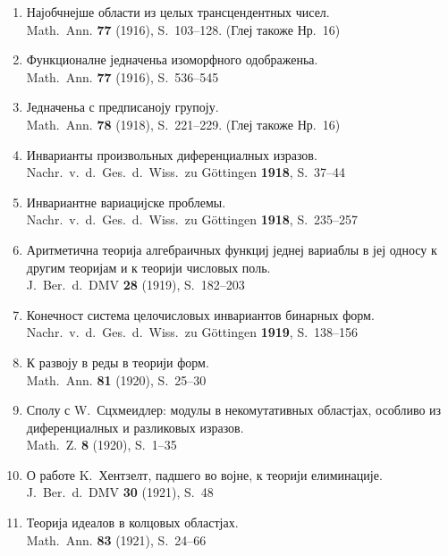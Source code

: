 \documentclass[11pt]{article}
\newcommand{\foreign}[1]{#1}
\begin{document}
\begin{enumerate}[label={\small\arabic*.},leftmargin=2em,itemsep=0.3em]
\item Најобчнејше области из целых трансцендентных чисел.\\
\foreign{Math.\ Ann.} \textbf{77} (1916), S.~103--128. (Глеј такоже Нр.~16)

\item Функционалне једначеньа изоморфного одображеньа.\\
\foreign{Math.\ Ann.} \textbf{77} (1916), S.~536--545

\item Једначеньа с предписаноју групоју.\\
\foreign{Math.\ Ann.} \textbf{78} (1918), S.~221--229. (Глеј такоже Нр.~16)

\item Инварианты произвольных диференциалных изразов.\\
\foreign{Nachr.\ v.\ d.\ Ges.\ d.\ Wiss.\ zu Göttingen} \textbf{1918}, S.~37--44

\item Инвариантне вариацијске проблемы.\\
\foreign{Nachr.\ v.\ d.\ Ges.\ d.\ Wiss.\ zu Göttingen} \textbf{1918}, S.~235--257

\item Аритметична теорија алгебраичных функциј једнеј вариаблы в јеј односу к другим теоријам и к теорији числовых поль.\\
\foreign{J.\ Ber.\ d.\ DMV} \textbf{28} (1919), S.~182--203

\item Конечност система целочисловых инвариантов бинарных форм.\\
\foreign{Nachr.\ v.\ d.\ Ges.\ d.\ Wiss.\ zu Göttingen} \textbf{1919}, S.~138--156

\item К развоју в реды в теорији форм.\\
\foreign{Math.\ Ann.} \textbf{81} (1920), S.~25--30

\item Сполу с W.\ Сцхмеидлер: модулы в некомутативных областјах, особливо из диференциалных и разликовых изразов.\\
\foreign{Math.\ Z.} \textbf{8} (1920), S.~1--35

\item О работе K.\ Хентзелт, падшего во војне, к теорији елиминације.\\
\foreign{J.\ Ber.\ d.\ DMV} \textbf{30} (1921), S.~48

\item Теорија идеалов в колцовых областјах.\\
\foreign{Math.\ Ann.} \textbf{83} (1921), S.~24--66


\end{enumerate}
\end{document}
